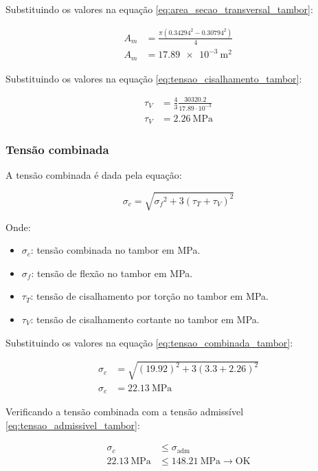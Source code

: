 \vspace{1em}

Substituindo os valores na equação \eqref{eq:area_secao_transversal_tambor}:

\begin{align*}
  A_m & = \frac{\pi \left( \num{0.34294}^2 - \num{0.30794}^2 \right)}{4} \\
  A_m & = \boxed{\SI{17.89e-3}{\meter\squared}}
\end{align*}

Substituindo os valores na equação \eqref{eq:tensao_cisalhamento_tambor}:

\begin{align*}
  \tau_V & = \frac{4}{3} \frac{\num{30320.2}}{\num{17.89} \cdot 10^{-3}} \\
  \tau_V & = \boxed{\SI{2.26}{\mega\pascal}}
\end{align*}

\subsubsection{Tensão combinada}

A tensão combinada é dada pela equação:

\begin{equation}
  \sigma_c = \sqrt{{\sigma_f}^2 + 3 {\left( \tau_T + \tau_V \right)}^2}
  \label{eq:tensao_combinada_tambor}
\end{equation}

Onde:

\begin{itemize}
  \item $\sigma_c$: tensão combinada no tambor em \si{\mega\pascal}.
  \item $\sigma_f$: tensão de flexão no tambor em \si{\mega\pascal}.
  \item $\tau_T$: tensão de cisalhamento por torção no tambor em \si{\mega\pascal}.
  \item $\tau_V$: tensão de cisalhamento cortante no tambor em \si{\mega\pascal}.
\end{itemize}

Substituindo os valores na equação \eqref{eq:tensao_combinada_tambor}:

\begin{align*}
  \sigma_c & = \sqrt{{\left( \num{19.92} \right)}^2 + 3 {\left( \num{3.3} + \num{2.26} \right)}^2} \\
  \sigma_c & = \boxed{\SI{22.13}{\mega\pascal}}
\end{align*}

Verificando a tensão combinada com a tensão admissível \eqref{eq:tensao_admissivel_tambor}:

\begin{align*}
  \sigma_c                 & \le \sigma_{\text{adm}}                             \\
  \SI{22.13}{\mega\pascal} & \le \SI{148.21}{\mega\pascal} \rightarrow \text{OK}
\end{align*}
